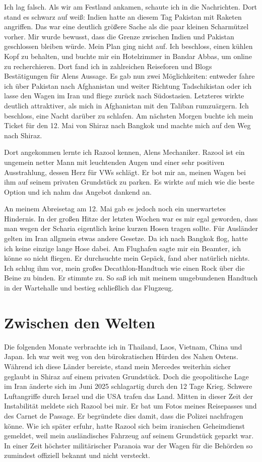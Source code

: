 Ich lag falsch. Als wir am Festland ankamen, schaute ich in die Nachrichten. Dort stand es schwarz auf weiß: Indien hatte an diesem Tag Pakistan mit Raketen angriffen. Das war eine deutlich größere Sache als die paar kleinen Scharmützel vorher. Mir wurde bewusst, dass die Grenze zwischen Indien und Pakistan geschlossen bleiben würde. Mein Plan ging nicht auf. Ich beschloss, einen kühlen Kopf zu behalten, und buchte mir ein Hotelzimmer in Bandar Abbas, um online zu recherchieren. Dort fand ich in zahlreichen Reiseforen und Blogs Bestätigungen für Alens Aussage. Es gab nun zwei Möglichkeiten: entweder fahre ich über Pakistan nach Afghanistan und weiter Richtung Tadschikistan oder ich lasse den Wagen im Iran und fliege zurück nach Südostasien. Letzteres wirkte deutlich attraktiver, als mich in Afghanistan mit den Taliban rumzuärgern. Ich beschloss, eine Nacht darüber zu schlafen. Am nächsten Morgen buchte ich mein Ticket für den 12. Mai von Shiraz nach Bangkok und machte mich auf den Weg nach Shiraz.

Dort angekommen lernte ich Razool kennen, Alens Mechaniker. Razool ist ein ungemein netter Mann mit leuchtenden Augen und einer sehr positiven Ausstrahlung, dessen Herz für VWs schlägt. Er bot mir an, meinen Wagen bei ihm auf seinem privaten Grundstück zu parken. Es wirkte auf mich wie die beste Option und ich nahm das Angebot dankend an.

An meinem Abreisetag am 12. Mai gab es jedoch noch ein unerwartetes Hindernis. In der großen Hitze der letzten Wochen war es mir egal geworden, dass man wegen der Scharia eigentlich keine kurzen Hosen tragen sollte. Für Ausländer gelten im Iran allgmein etwas andere Gesetze. Da ich nach Bangkok flog, hatte ich keine einzige lange Hose dabei. Am Flughafen sagte mir ein Beamter, ich könne so nicht fliegen. Er durchsuchte mein Gepäck, fand aber natürlich nichts. Ich schlug ihm vor, mein großes Decathlon-Handtuch wie einen Rock über die Beine zu binden. Er stimmte zu. So saß ich mit meinem umgebundenen Handtuch in der Wartehalle und bestieg schließlich das Flugzeug.

\chapter*{Zwischen den Welten}

Die folgenden Monate verbrachte ich in Thailand, Laos, Vietnam, China und Japan. Ich war weit weg von den bürokratischen Hürden des Nahen Ostens. Während ich diese Länder bereiste, stand mein Mercedes weiterhin sicher geglaubt in Shiraz auf einem privaten Grundstück. Doch die geopolitische Lage im Iran änderte sich im Juni 2025 schlagartig durch den 12 Tage Krieg. Schwere Luftangriffe durch Israel und die USA trafen das Land. Mitten in dieser Zeit der Instabilität meldete sich Razool bei mir. Er bat um Fotos meines Reisepasses und des Carnet de Passage. Er begründete dies damit, dass die Polizei nachfragen könne. Wie ich später erfuhr, hatte Razool sich beim iranischen Geheimdienst gemeldet, weil mein ausländisches Fahrzeug auf seinem Grundstück geparkt war. In einer Zeit höchster militärischer Paranoia war der Wagen für die Behörden so zumindest offiziell bekannt und nicht versteckt.

